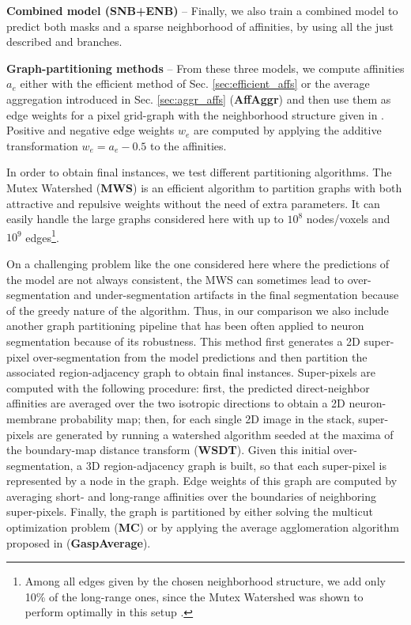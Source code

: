 \textbf{Combined model (SNB+ENB)} -- Finally, we also train a combined model to predict both \maskname masks and a sparse neighborhood of affinities, by using all the just described \emph{\encBr} and \emph{\sparseBr} branches.  

\textbf{Graph-partitioning methods} -- From these three models, we compute affinities $a_e$ either with the efficient method of Sec. \ref{sec:efficient_affs} or the average aggregation introduced in Sec. \ref{sec:aggr_affs} (\textbf{AffAggr}) and then use them as edge weights for a pixel grid-graph with the neighborhood structure given in . Positive and negative edge weights $w_e$ are computed by applying the additive transformation $w_e=a_e-0.5$ to the affinities.

In order to obtain final instances, we test different partitioning algorithms.
The Mutex Watershed (\textbf{MWS}) \cite{wolf2018mutex} is an efficient algorithm to partition graphs with both attractive and repulsive weights without the need of extra parameters. It can easily handle the large graphs considered here with up to $10^8$ nodes/voxels and $10^9$ edges\footnote{Among all edges given by the chosen neighborhood structure, we add only 10\% of the long-range ones, since the Mutex Watershed was shown to perform optimally in this setup \cite{bailoni2019generalized,wolf2018mutex}.}. 

On a challenging problem like the one considered here where the predictions of the model are not always consistent, the MWS can sometimes lead to over-segmentation and under-segmentation artifacts in the final segmentation because of the greedy nature of the algorithm.
Thus, in our comparison we also include another graph partitioning pipeline that has been often applied to neuron segmentation because of its robustness. This method first generates a 2D super-pixel over-segmentation from the model predictions and then partition the associated region-adjacency graph to obtain final instances. Super-pixels are computed with the following procedure: first, the predicted direct-neighbor affinities are averaged over the two isotropic directions to obtain a 2D neuron-membrane probability map; then, for each single 2D image in the stack, super-pixels are generated by running a watershed algorithm seeded at the maxima of the boundary-map distance transform (\textbf{WSDT}). Given this initial over-segmentation, a 3D region-adjacency graph is built, so that each super-pixel is represented by a node in the graph. Edge weights of this graph are computed by averaging short- and long-range affinities over the boundaries of neighboring super-pixels. 
Finally, the graph is partitioned by either solving the multicut optimization problem (\textbf{MC}) or by applying the average agglomeration algorithm proposed in \cite{bailoni2019generalized} (\textbf{GaspAverage}).\\

